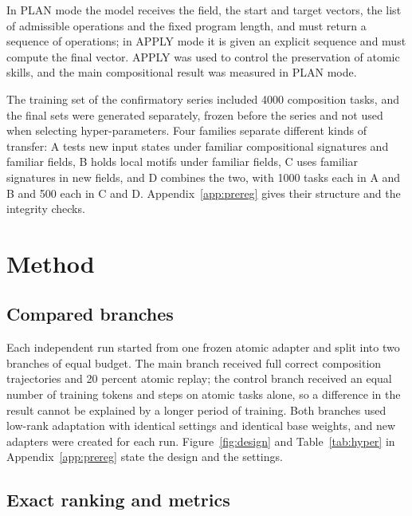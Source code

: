 \documentclass{zapiski}
\begin{document}
In PLAN mode the model receives the field, the start and target vectors, the list of
admissible operations and the fixed program length, and must return a sequence of
operations; in APPLY mode it is given an explicit sequence and must compute the final
vector. APPLY was used to control the preservation of atomic skills, and the main
compositional result was measured in PLAN mode.

The training set of the confirmatory series included 4000 composition tasks, and the
final sets were generated separately, frozen before the series and not used when
selecting hyper-parameters. Four families separate different kinds of transfer: A tests
new input states under familiar compositional signatures and familiar fields, B holds
local motifs under familiar fields, C uses familiar signatures in new fields, and D
combines the two, with 1000 tasks each in A and B and 500 each in C and D.
Appendix~\ref{app:prereg} gives their structure and the integrity checks.

\section{Method}
\label{sec:method}

\subsection{Compared branches}

Each independent run started from one frozen atomic adapter and split into two branches
of equal budget. The main branch received full correct composition trajectories and 20
percent atomic replay; the control branch received an equal number of training tokens
and steps on atomic tasks alone, so a difference in the result cannot be explained by a
longer period of training. Both branches used low-rank adaptation with identical
settings and identical base weights, and new adapters were created for each run.
Figure~\ref{fig:design} and Table~\ref{tab:hyper} in Appendix~\ref{app:prereg} state
the design and the settings.

\subsection{Exact ranking and metrics}
\end{document}
